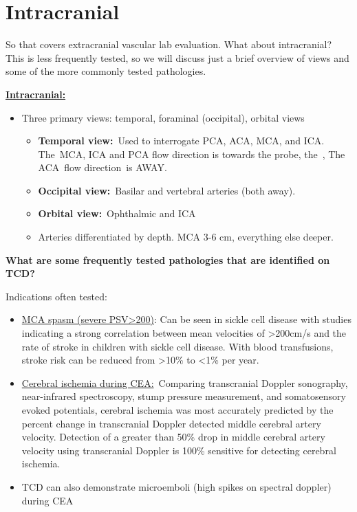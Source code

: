 \documentclass[
]{book}
\begin{document}
\hypertarget{intracranial}{%
\section{Intracranial}\label{intracranial}}

So that covers extracranial vascular lab evaluation. What about
intracranial? This is less frequently tested, so we will discuss just a
brief overview of views and some of the more commonly tested
pathologies.

\underline{\textbf{Intracranial:}}

\begin{itemize}
\item
  Three primary views: temporal, foraminal (occipital), orbital views

  \begin{itemize}
  \item
    \textbf{Temporal view:}~Used to interrogate PCA, ACA, MCA, and ICA.
    The~MCA, ICA and PCA flow direction is towards the probe, the~,
    The ACA~flow direction~is AWAY.
  \item
    \textbf{Occipital view:}~Basilar and vertebral arteries (both away).
  \item
    \textbf{Orbital view:}~Ophthalmic and ICA
  \item
    Arteries differentiated by depth. MCA 3-6 cm, everything else
    deeper.
  \end{itemize}
\end{itemize}

\textbf{What are some frequently tested pathologies that are identified on
TCD?}

Indications often tested:

\begin{itemize}
\item
  \underline{MCA spasm (severe PSV\textgreater200)}: Can be seen in sickle cell
  disease with studies indicating a strong correlation between mean
  velocities of \textgreater200cm/s and the rate of stroke in children with
  sickle cell disease. With blood transfusions, stroke risk can be
  reduced from \textgreater10\% to \textless1\% per year.
  \citep{bulasTranscranialDopplerTCD2000}
\item
  \underline{Cerebral ischemia during CEA:}~Comparing transcranial Doppler
  sonography, near-infrared spectroscopy, stump pressure measurement,
  and somatosensory evoked potentials, cerebral ischemia was most
  accurately predicted by the percent change in transcranial Doppler
  detected middle cerebral artery velocity. Detection of a greater
  than 50\% drop in middle cerebral artery velocity using transcranial
  Doppler is 100\% sensitive for detecting cerebral
  ischemia.\citep{moritzAccuracyCerebralMonitoring2007}
\item
  TCD can also demonstrate microemboli (high spikes on spectral
  doppler) during CEA
\end{itemize}
\end{document}
